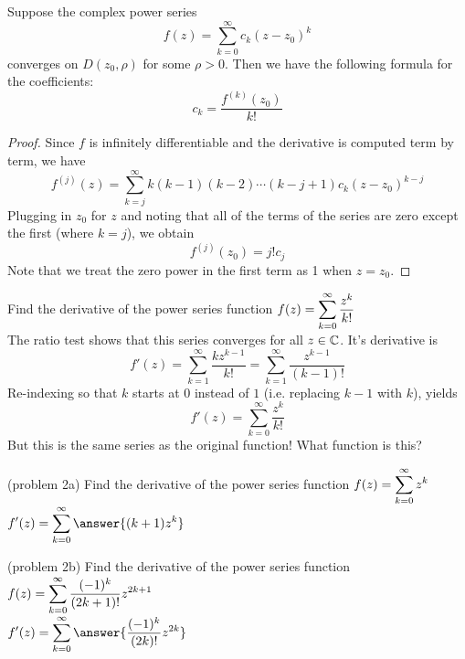 \documentclass[handout]{ximera}
\begin{document}
\begin{corollary}
Suppose the complex power series
\[
f(z) = \sum_{k=0}^\infty c_k(z-z_0)^k
\]
converges on $D(z_0, \rho)$ for some $\rho > 0$. Then we have the following formula for the coefficients:
\[
c_k = \frac{f^{(k)}(z_0)}{k!}
\]
\end{corollary}
\begin{proof}
Since $f$ is infinitely differentiable and the derivative is computed term by term, we have
\[
f^{(j)}(z) = \sum_{k=j}^\infty k(k-1)(k-2)\cdots(k-j+1)c_k(z-z_0)^{k-j}
\]
Plugging in $z_0$ for $z$ and noting that all of the terms of the series are zero except the first (where $k = j$),
we obtain
\[
f^{(j)}(z_0) = j!c_j
\]
Note that we treat the zero power in the first term as 1 when $z=z_0$.
\end{proof}

\begin{example}[example 2]
Find the derivative of the power series function $\displaystyle f(z) = \sum_{k=0}^\infty \frac{z^k}{k!}$\\
The ratio test shows that this series converges for all $z \in \mathbb C$. It's derivative is
\[
f'(z) = \sum_{k=1}^\infty\frac{kz^{k-1}}{k!}= \sum_{k=1}^\infty \frac{z^{k-1}}{(k-1)!}
\]
Re-indexing so that $k$ starts at $0$ instead of $1$ (i.e. replacing $k-1$ with $k$), yields
\[
f'(z) = \sum_{k=0}^\infty \frac{z^k}{k!}
\]
But this is the same series as the original function! What function is this?
\end{example}

\begin{problem}(problem 2a)
Find the derivative of the power series function $\displaystyle f(z) = \sum_{k=0}^\infty z^k$\\
$\dis f'(z) = \sum_{k=0}^\infty \answer{(k+1)z^k}$
\end{problem}

\begin{problem}(problem 2b)
Find the derivative of the power series function $\displaystyle f(z) = \sum_{k=0}^\infty \frac{(-1)^k}{(2k+1)!}z^{2k+1}$\\
$\dis f'(z) = \sum_{k=0}^\infty \answer{\frac{(-1)^k}{(2k)!}z^{2k}}$
\end{problem}
\end{document}
